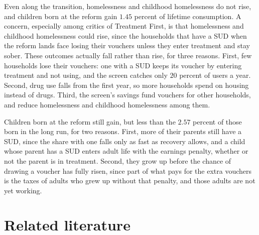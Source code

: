 \documentclass[10pt]{article}
\newif\ifshowupdates \showupdatesfalse
\newcommand{\updnum}[1]{\ifshowupdates{\color{blue}#1}\else#1\fi}
\begin{document}
Even along the transition, homelessness and childhood homelessness do not rise, and children born at the reform gain \updnum{$1.45$} percent of lifetime consumption. A concern, especially among critics of Treatment First, is that homelessness and childhood homelessness could rise, since the households that have a SUD when the reform lands face losing their vouchers unless they enter treatment and stay sober. These outcomes actually fall rather than rise, for three reasons. First, few households lose their vouchers: one with a SUD keeps its voucher by entering treatment and not using, and the screen catches only $20$ percent of users a year. Second, drug use falls from the first year, so more households spend on housing instead of drugs. Third, the screen's savings fund vouchers for other households, and reduce homelessness and childhood homelessness among them.

Children born at the reform still gain, but less than the \updnum{$2.57$} percent of those born in the long run, for two reasons. First, more of their parents still have a SUD, since the share with one falls only as fast as recovery allows, and a child whose parent has a SUD enters adult life with the earnings penalty, whether or not the parent is in treatment. Second, they grow up before the chance of drawing a voucher has fully risen, since part of what pays for the extra vouchers is the taxes of adults who grew up without that penalty, and those adults are not yet working. 


\section{Related literature}\label{sec:literature}
\end{document}
